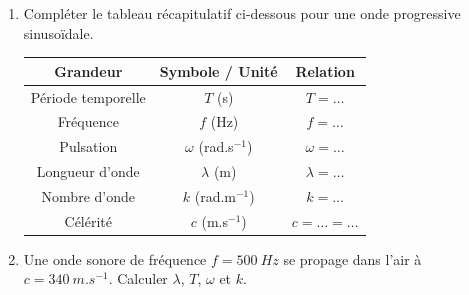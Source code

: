 \documentclass[11pt]{article}
\begin{document}
\begin{exercice}
\begin{enumerate}
    \item Compléter le tableau récapitulatif ci-dessous pour une onde progressive sinusoïdale.
    \begin{center}
        \begin{tabular}{|c|c|c|}
            \hline
            \textbf{Grandeur} & \textbf{Symbole / Unité} & \textbf{Relation} \\
            \hline
            Période temporelle & $T$ (s) & $T = \dots$ \\
            \hline
            Fréquence & $f$ (Hz) & $f = \dots$ \\
            \hline
            Pulsation & $\omega$ (rad.s$^{-1}$) & $\omega = \dots$ \\
            \hline
            Longueur d'onde & $\lambda$ (m) & $\lambda = \dots$ \\
            \hline
            Nombre d'onde & $k$ (rad.m$^{-1}$) & $k = \dots$ \\
            \hline
            Célérité & $c$ (m.s$^{-1}$) & $c = \dots = \dots$ \\
            \hline
        \end{tabular}
    \end{center}
    \item Une onde sonore de fréquence $f = \SI{500}{Hz}$ se propage dans l'air à $c = \SI{340}{m.s^{-1}}$. Calculer $\lambda$, $T$, $\omega$ et $k$.
\end{enumerate}
\end{exercice}
\end{document}
